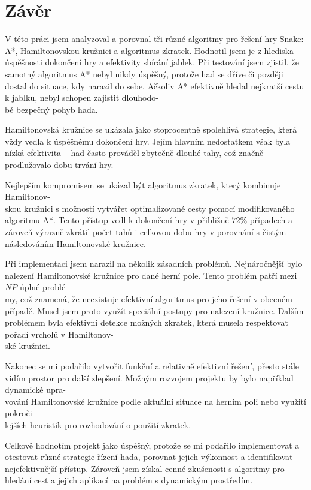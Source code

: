 \chapter{Závěr}

V této práci jsem analyzoval a porovnal tři různé algoritmy pro řešení hry Snake: A*, Hamiltonovskou kružnici a algoritmus zkratek. Hodnotil jsem je z hlediska úspěšnosti dokončení hry a efektivity sbírání jablek. Při testování jsem zjistil, že samotný algoritmus A* nebyl nikdy úspěšný, protože had se dříve či později dostal do situace, kdy narazil do sebe. Ačkoliv A* efektivně hledal nejkratší cestu k jablku, nebyl schopen zajistit dlouhodo-\\ bě bezpečný pohyb hada.

Hamiltonovská kružnice se ukázala jako stoprocentně spolehlivá strategie, která vždy vedla k úspěšnému dokončení hry. Jejím hlavním nedostatkem však byla nízká efektivita – had často prováděl zbytečně dlouhé tahy, což značně prodlužovalo dobu trvání hry.

Nejlepším kompromisem se ukázal být algoritmus zkratek, který kombinuje Hamiltonov-\\skou kružnici s možností vytvářet optimalizované cesty pomocí modifikovaného algoritmu A*. Tento přístup vedl k dokončení hry v přibližně \(72\%\) případech a zároveň výrazně zkrátil počet tahů i celkovou dobu hry v porovnání s čistým následováním Hamiltonovské kružnice.

Při implementaci jsem narazil na několik zásadních problémů. Nejnáročnější bylo nalezení Hamiltonovské kružnice pro dané herní pole. Tento problém patří mezi \(NP\)-úplné problé-\\my, což znamená, že neexistuje efektivní algoritmus pro jeho řešení v obecném případě. Musel jsem proto využít speciální postupy pro nalezení kružnice. Dalším problémem byla efektivní detekce možných zkratek, která musela respektovat pořadí vrcholů v Hamiltonov-\\ské kružnici. 

Nakonec se mi podařilo vytvořit funkční a relativně efektivní řešení, přesto stále vidím prostor pro další zlepšení. Možným rozvojem projektu by bylo například dynamické upra-\\vování Hamiltonovské kružnice podle aktuální situace na herním poli nebo využití pokroči-\\lejších heuristik pro rozhodování o použití zkratek.

Celkově hodnotím projekt jako úspěšný, protože se mi podařilo implementovat a otestovat různé strategie řízení hada, porovnat jejich výkonnost a identifikovat nejefektivnější přístup. Zároveň jsem získal cenné zkušenosti s algoritmy pro hledání cest a jejich aplikací na problém s dynamickým prostředím.